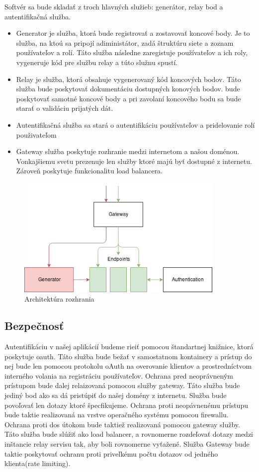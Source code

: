 Softvér sa bude skladať z troch hlavných služieb: generátor, relay bod a autentifikačná služba.
\begin{itemize}
	\item Generator je služba, ktorá bude registrovať a zostavovať koncové body. Je to služba, na ktoú sa pripojí adiministátor, zadá štruktúru siete a zoznam používateľov a rolí. Táto služba následne zaregistuje používateľov a ich roly, vygeneruje kód pre službu relay a túto služnu spustí.
	\item Relay je služba, ktorá obsahuje vygenerovaný kód koncových bodov. Táto služba bude poskytovať dokumentáciu dostupných konových bodov. bude poskytovať samotné koncové body a pri zavolaní koncového bodu sa bude starať o validáciu prijatých dát.
	\item Autentifikačná služba sa stará o autentifikáciu používateľov a pridelovanie rolí použivateľom
	\item Gateway služba poskytuje rozhranie medzi internetom a našou doménou. Vonkajšiemu svetu prezenuje len služby ktoré majú byť dostupné z internetu. Zároveň poskytuje funkcionalitu load balancera. 
\end{itemize}


\begin{figure}[!htbp]
	\centering
	\includegraphics[width=10cm]{img/architecture.png}
	\caption{Architektúra rozhrania}
	\label{architecture}
\end{figure} 


\subsection{Bezpečnosť}
Autentifikáciu v našej aplikácií budeme rieiť pomocou štandartnej knižnice, ktorá poskytuje \acrshort{oauth}. Táto služba bude bežať v samostatnom kontainery a prístup do nej bude len pomocou protokolu oAuth na overovanie klientov a prostredníctvom interného volania na registráciu používateľov.
Ochrana pred neoprávneným prístupom bude dalej relaizovaná pomocou služby gateway. Táto služba bude jediný bod ako sa dá pristúpiť do našej domény z internetu. Služba bude povoľovať len dotazy ktoré špecfikujeme. Ochrana proti neopávnenému prístupu bude taktie realizovaná na vrstve operačného systému pomocou firewallu.
Ochrana proti \acrshort{dos} útokom bude taktiež realizovaná pomocou gateway služby. Táto služba bude slúžiť ako load balancer, a rovnomerne rozdeľovať dotazy medzi inštancie relay servisu tak, aby boli rovnomerne vyťažené. Služba Gateway bude taktie poskytovať ochranu proti priveľkému počtu dotazov od jedného klienta(rate limiting).


